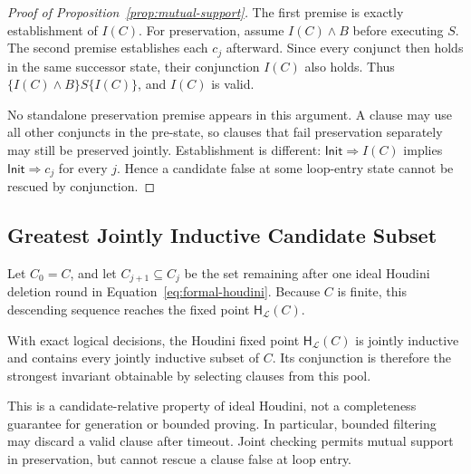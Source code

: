 \begin{proof}[Proof of Proposition~\ref{prop:mutual-support}]
The first premise is exactly establishment of \(I(C)\).  For preservation,
assume \(I(C)\wedge B\) before executing \(S\).  The second premise establishes
each \(c_j\) afterward.  Since every conjunct then holds in the same successor
state, their conjunction \(I(C)\) also holds.  Thus
\(\{I(C)\wedge B\}S\{I(C)\}\), and \(I(C)\) is valid.

No standalone preservation premise appears in this argument.  A clause may
use all other conjuncts in the pre-state, so clauses that fail preservation
separately may still be preserved jointly.  Establishment is different:
\(\mathsf{Init}\Rightarrow I(C)\) implies \(\mathsf{Init}\Rightarrow c_j\) for every \(j\).  Hence a
candidate false at some loop-entry state cannot be rescued by conjunction.
\end{proof}

\subsection{Greatest Jointly Inductive Candidate Subset}

Let \(C_0=C\), and let \(C_{j+1}\subseteq C_j\) be the set remaining after one
ideal Houdini deletion round in Equation~\eqref{eq:formal-houdini}.  Because \(C\) is
finite, this descending sequence reaches the fixed point
\(\mathsf H_{\mathcal L}(C)\).

\begin{theorem}
\label{thm:houdini-greatest}
With exact logical decisions, the Houdini fixed point
\(\mathsf H_{\mathcal L}(C)\) is jointly inductive and contains every jointly
inductive subset of \(C\).  Its conjunction is therefore the strongest
invariant obtainable by selecting clauses from this pool.
\end{theorem}
This is a candidate-relative property of ideal Houdini, not a completeness
guarantee for generation or bounded proving.  In particular, bounded
filtering may discard a valid clause after timeout.  Joint checking permits
mutual support in preservation, but cannot rescue a clause false at loop entry.

